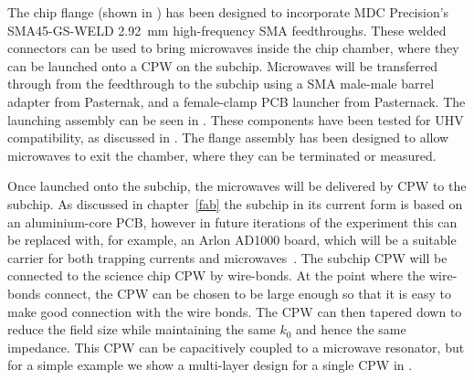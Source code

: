 The chip flange (shown in ) has been
designed to incorporate MDC Precision's SMA45-GS-WELD \SI{2.92}{\milli\meter}
high-frequency SMA feedthroughs. These welded connectors can be used to bring
microwaves inside the chip chamber, where they can be launched onto a CPW on
the subchip. Microwaves will be transferred through from the feedthrough to the
subchip using a SMA male-male barrel adapter from Pasternak, and a female-clamp
PCB launcher from Pasternack. The launching assembly can be seen in
. These components have been tested for UHV
compatibility, as discussed in .  The flange
assembly has been designed to allow microwaves to exit the chamber, where they
can be terminated or measured.

Once launched onto the subchip, the microwaves will be delivered by CPW to the
subchip. 
%
As discussed in chapter~\ref{fab} the subchip in its current form is based on an
aluminium-core PCB, however in future iterations of the experiment this can be
replaced with, for example, an Arlon AD1000 board, which will be a suitable
carrier for both trapping currents and microwaves~\cite{Morgan2020}. 
%
The subchip CPW will be connected to the science chip CPW by wire-bonds.  At
the point where the wire-bonds connect, the CPW can be chosen to be 
large enough so that it is easy to make good connection with the wire bonds. The CPW
can then tapered down to reduce the field size while maintaining the same $k_0$
and hence the same impedance. This CPW can be capacitively coupled to a
microwave resonator, but for a simple example we show a multi-layer design for
a single CPW in .

